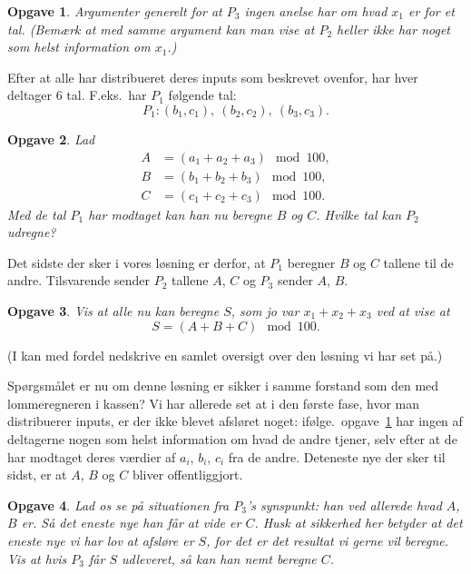 \documentclass{article}
\theoremstyle{opgavedd}
\newtheorem{opgave}{Opgave}[section]
\begin{document}
\begin{opgave}\label{opg:secure-inputs}
    Argumenter generelt for at $P_{3}$ ingen anelse har om hvad $x_{1}$ er for et
    tal. (Bemærk at med samme argument kan man vise at $P_{2}$ heller ikke har noget som
    helst information om $x_{1}$.)
\end{opgave}

Efter at alle har distribueret deres inputs som beskrevet ovenfor, har hver deltager 6
tal. F.eks.~har $P_{1}$ følgende tal:
\[
  P_{1}:(b_{1},c_{1}),\ (b_{2},c_{2}),\ (b_{3},c_{3}).
\]

\begin{opgave}
  Lad
  \begin{align*}
    A&=(a_{1} + a_{2} + a_{3})\mod{100},\\
    B&=(b_{1} + b_{2} + b_{3})\mod{100},\\
    C&=(c_{1} + c_{2} + c_{3})\mod{100}.
  \end{align*}
  Med de tal $P_{1}$ har modtaget kan han nu beregne $B$ og $C$. Hvilke tal
  kan $P_{2}$ udregne?
\end{opgave}

Det sidste der sker i vores løsning er derfor, at $P_{1}$ beregner $B$ og $C$ tallene til
de andre. Tilsvarende sender $P_{2}$ tallene $A$, $C$ og $P_{3}$ sender $A$, $B$.

\begin{opgave}
  Vis at alle nu kan beregne $S$, som jo var $x_{1} + x_{2} + x_{3}$ ved at vise at
  \[
    S = (A + B + C)\mod 100.
  \]
\end{opgave}

(I kan med fordel nedskrive en samlet oversigt over den løsning vi har set på.)

\clearpage

Spørgsmålet er nu om denne løsning er sikker i samme forstand som den med lommeregneren i
kassen? Vi har allerede set at i den første fase, hvor man distribuerer inputs, er der
ikke blevet afsløret noget: ifølge.~opgave~\ref{opg:secure-inputs} har ingen af deltagerne
nogen som helst information om hvad de andre tjener, selv efter at de har modtaget deres
værdier af $a_{i}$, $b_{i}$, $c_{i}$ fra de andre. Deteneste nye der sker til sidst, er at
$A$, $B$ og $C$ bliver offentliggjort.

\begin{opgave}
  Lad os se på situationen fra $P_{3}$'s synspunkt: han ved allerede hvad $A$, $B$ er. Så
  det eneste nye han får at vide er $C$. Husk at sikkerhed her betyder at det eneste nye
  vi har lov at afsløre er $S$, for det er det resultat vi gerne vil beregne. Vis at hvis
  $P_{3}$ får $S$ udleveret, så kan han nemt beregne $C$.
\end{opgave}
\end{document}
